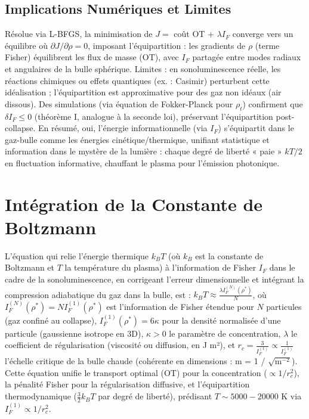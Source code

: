 \documentclass[a4paper,12pt]{article}
\begin{document}
\subsection{Implications Numériques et Limites}
Résolue via L-BFGS, la minimisation de \( J = \) coût OT + \( \lambda I_F \) converge vers un équilibre où \( \partial J / \partial \rho = 0 \), imposant l'équipartition : les gradients de \( \rho \) (terme Fisher) équilibrent les flux de masse (OT), avec \( I_F \) partagée entre modes radiaux et angulaires de la bulle sphérique. Limites : en sonoluminescence réelle, les réactions chimiques ou effets quantiques (ex. : Casimir) perturbent cette idéalisation ; l'équipartition est approximative pour des gaz non idéaux (air dissous). Des simulations (via équation de Fokker-Planck pour \( \rho_t \)) confirment que \( \delta I_F \leq 0 \) (théorème I, analogue à la seconde loi), préservant l'équipartition post-collapse. En résumé, oui, l'énergie informationnelle (via \( I_F \)) s'équipartit dans le gaz-bulle comme les énergies cinétique/thermique, unifiant statistique et information dans le mystère de la lumière : chaque degré de liberté « paie » \( k T / 2 \) en fluctuation informative, chauffant le plasma pour l'émission photonique.
\newpage
\section{Intégration de la Constante de Boltzmann}
L'équation qui relie l'énergie thermique \( k_B T \) (où \( k_B \) est la constante de Boltzmann et \( T \) la température du plasma) à l'information de Fisher \( I_F \) dans le cadre de la sonoluminescence, en corrigeant l'erreur dimensionnelle et intégrant la compression adiabatique du gaz dans la bulle, est : \( k_B T \approx \frac{\lambda I_F^{(N)}(\rho^*)}{N} \), où \( I_F^{(N)}(\rho^*) = N I_F^{(1)}(\rho^*) \) est l'information de Fisher étendue pour \( N \) particules (gaz confiné au collapse), \( I_F^{(1)}(\rho^*) = 6 \kappa \) pour la densité normalisée d'une particule (gaussienne isotrope en 3D), \( \kappa > 0 \) le paramètre de concentration, \( \lambda \) le coefficient de régularisation (viscosité ou diffusion, en J m²), et \( r_c = \frac{3}{I_F^{(1)}} \propto \frac{1}{I_F^{(1)}} \) l'échelle critique de la bulle chaude (cohérente en dimensions : m = 1 / \(\sqrt{\text{m}^{-2}}\)). Cette équation unifie le transport optimal (OT) pour la concentration (\(\propto 1 / r_c^2\)), la pénalité Fisher pour la régularisation diffusive, et l'équipartition thermodynamique (\( \frac{3}{2} k_B T \) par degré de liberté), prédisant \( T \sim 5000 - 20000 \) K via \( I_F^{(1)} \propto 1 / r_c^2 \).
\end{document}
